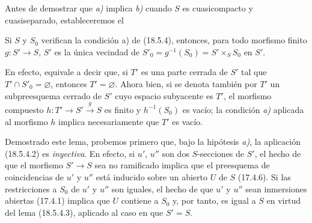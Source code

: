 Antes de demostrar que \emph{a)} implica \emph{b)} cuando $S$ es cuasicompacto y cuasiseparado, estableceremos el

\begin{lemma}[18.5.4.3]
\label{IV.18.5.4.3}
Si $S$ y $S_0$ verifican la condición \textup{a)} de \textup{(18.5.4)}, entonces, para todo morfismo \textup{finito} $g:S'\to S$, $S'$ es la única vecindad de $S'_0=g^{-1}(S_0)=S'\times_S S_0$ en $S'$.
\end{lemma}

En efecto, equivale a decir que, si $T'$ es una parte cerrada de $S'$ tal que $T'\cap S'_0=\varnothing$, entonces $T'=\varnothing$. Ahora bien, si se denota también por $T'$ un subpreesquema cerrado de $S'$ cuyo espacio subyacente es $T'$, el morfismo compuesto $h:T'\to S'\xrightarrow{g}S$ es finito y $h^{-1}(S_0)$ es vacío; la condición \emph{a)} aplicada al morfismo $h$ implica necesariamente que $T'$ es vacío.

Demostrado este lema, probemos primero que, bajo la hipótesis \emph{a)}, la aplicación (18.5.4.2) es \emph{inyectiva}. En efecto, si $u'$, $u''$ son dos $S$-secciones de $S'$, el hecho de que el morfismo $S'\to S$ sea no ramificado implica que el preesquema de coincidencias de $u'$ y $u''$ está inducido sobre un abierto $U$ de $S$ (17.4.6). Si las restricciones a $S_0$ de $u'$ y $u''$ son iguales, el hecho de que $u'$ y $u''$ sean inmersiones abiertas (17.4.1) implica que $U$ contiene a $S_0$ y, por tanto, es igual a $S$ en virtud del lema (18.5.4.3), aplicado al caso en que $S'=S$.


